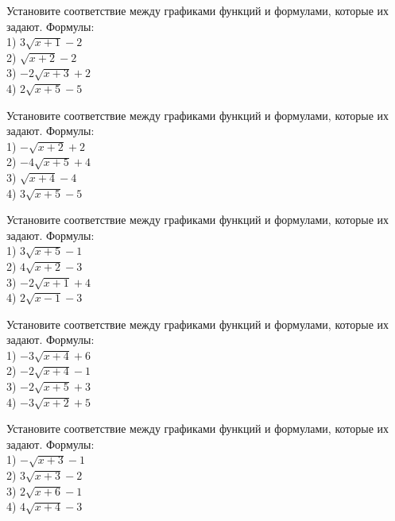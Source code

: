 \documentclass[4apaper]{article}
\begin{document}
\begin{taskBN}{36}
Установите соответствие между графиками функций и формулами, которые их задают. Формулы: \\1) $3\sqrt{x+1}-2$\\2) $\sqrt{x+2}-2$\\3) $-2\sqrt{x+3}+2$\\4) $2\sqrt{x+5}-5$
\end{taskBN}

\begin{taskBN}{37}
Установите соответствие между графиками функций и формулами, которые их задают. Формулы: \\1) $-\sqrt{x+2}+2$\\2) $-4\sqrt{x+5}+4$\\3) $\sqrt{x+4}-4$\\4) $3\sqrt{x+5}-5$
\end{taskBN}

\begin{taskBN}{38}
Установите соответствие между графиками функций и формулами, которые их задают. Формулы: \\1) $3\sqrt{x+5}-1$\\2) $4\sqrt{x+2}-3$\\3) $-2\sqrt{x+1}+4$\\4) $2\sqrt{x-1}-3$
\end{taskBN}

\begin{taskBN}{39}
Установите соответствие между графиками функций и формулами, которые их задают. Формулы: \\1) $-3\sqrt{x+4}+6$\\2) $-2\sqrt{x+4}-1$\\3) $-2\sqrt{x+5}+3$\\4) $-3\sqrt{x+2}+5$
\end{taskBN}

\begin{taskBN}{40}
Установите соответствие между графиками функций и формулами, которые их задают. Формулы: \\1) $-\sqrt{x+3}-1$\\2) $3\sqrt{x+3}-2$\\3) $2\sqrt{x+6}-1$\\4) $4\sqrt{x+4}-3$
\end{taskBN}
\end{document}
